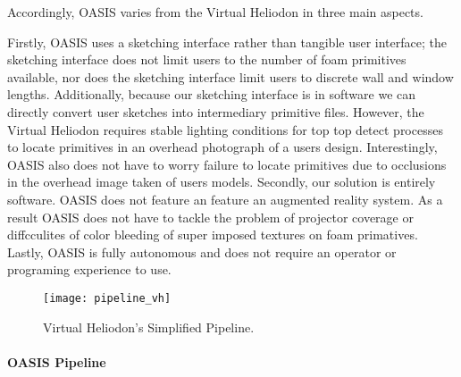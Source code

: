 			Accordingly, OASIS varies from the Virtual Heliodon in three main aspects.

			Firstly, OASIS uses a sketching interface rather than tangible user interface;
			the sketching interface does not limit users to the number of foam primitives available, nor does the sketching interface limit users to discrete wall and window lengths.
			Additionally, because our sketching interface is in software we can directly convert user sketches into intermediary primitive files. However, the Virtual Heliodon requires stable lighting conditions for top top detect processes to locate primitives in an overhead photograph of a users design.
			Interestingly, OASIS also does not have to worry failure to locate primitives due to occlusions in the overhead image taken of users models.
			Secondly, our solution is entirely software. OASIS does not feature an feature an augmented reality system.
			As a result OASIS does not have to tackle the problem of projector coverage \cite{sheng2009virtual} or diffcculites of color bleeding of super imposed textures on foam primatives\cite{sheng2011perceptual}.
			Lastly, OASIS is fully autonomous and does not require an operator or programing experience to use.









  		\begin{figure}[h]
			\centering
			\texttt{[image: pipeline\_vh]}
			\caption{Virtual Heliodon's Simplified Pipeline.}
			\label{fig:new_pipeline}
			\end{figure}








		\paragraph{OASIS Pipeline}

